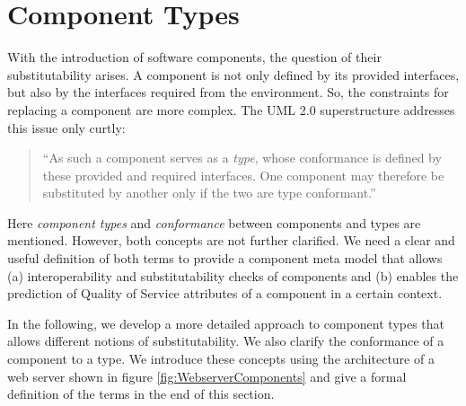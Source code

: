 \section{Component Types}
With the introduction of software components, the question of their substitutability arises. A component is not only defined by its provided interfaces, but also by the interfaces required from the environment. So, the constraints for replacing a component are more complex. The UML 2.0 superstructure addresses this issue only curtly:

\begin{quote}
``As such a component serves as a \emph{type}, whose conformance is defined by these provided and required interfaces. One component may therefore be substituted by another only if the two are type conformant.''
\end{quote}

Here \emph{component types} and \emph{conformance} between components and types are mentioned. However, both concepts are not further clarified. We need a clear and useful definition of both terms to provide a component meta model that allows (a)  interoperability and substitutability checks of components and (b) enables the prediction of Quality of Service attributes of a component in a certain context.

In the following, we develop a more detailed approach to component types that allows different notions of substitutability. We also clarify the conformance of a component to a type. We introduce these concepts using the architecture of a web server shown in figure \ref{fig:WebserverComponents} and give a formal definition of the terms in the end of this section.


